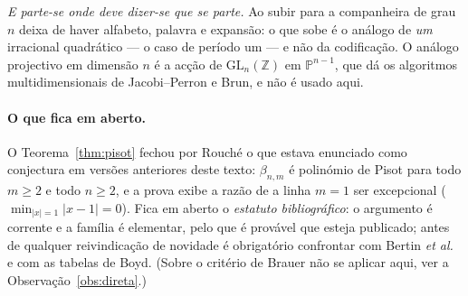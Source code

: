 \documentclass[11pt,a4paper]{article}
\theoremstyle{plain}
\theoremstyle{definition}
\theoremstyle{remark}
\newcommand{\Z}{\mathbb{Z}}
\newcommand{\GL}{\mathrm{GL}}
\begin{document}
\emph{E parte-se onde deve dizer-se que se parte.} Ao subir para a companheira de grau $n$ deixa de
haver alfabeto, palavra e expansão: o que sobe é o análogo de \emph{um} irracional quadrático --- o
caso de período um --- e não da codificação. O análogo projectivo em dimensão $n$ é a acção de
$\GL_n(\Z)$ em $\mathbb P^{n-1}$, que dá os algoritmos multidimensionais de Jacobi--Perron e Brun, e não é
usado aqui.

\paragraph{O que fica em aberto.} O Teorema~\ref{thm:pisot} fechou por Rouché o que estava
enunciado como conjectura em versões anteriores deste texto: $\beta_{n,m}$ é polinómio de Pisot
para todo $m\geq2$ e todo $n\geq2$, e a prova exibe a razão de a linha $m=1$ ser excepcional
($\min_{|x|=1}|x-1| = 0$). Fica em aberto o \emph{estatuto bibliográfico}: o argumento é corrente e
a família é elementar, pelo que é provável que esteja publicado; antes de qualquer reivindicação de
novidade é obrigatório confrontar com Bertin \emph{et al.}~\cite{bertin} e com as tabelas de Boyd.
(Sobre o critério de Brauer não se aplicar aqui, ver a Observação~\ref{obs:direta}.)
\end{document}
